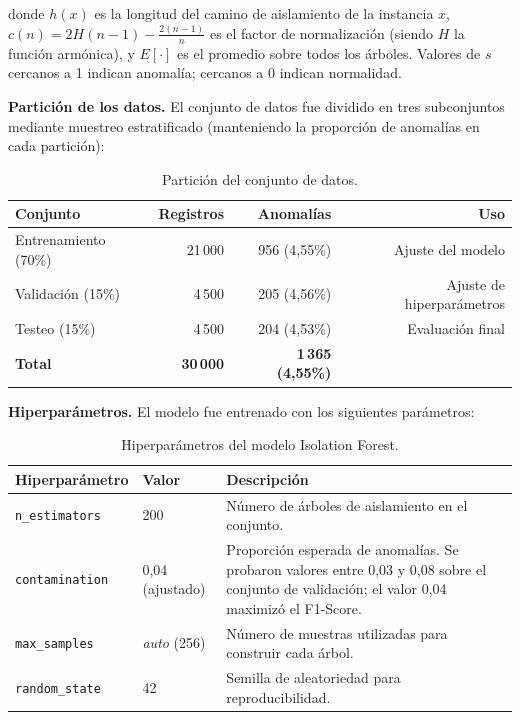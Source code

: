\documentclass[12pt,letterpaper, oneside]{book}
\begin{document}
    donde $h(x)$ es la longitud del camino de aislamiento de la instancia
    $x$, $c(n) = 2H(n-1) - \frac{2(n-1)}{n}$ es el factor de
    normalización (siendo $H$ la función armónica), y $E[\cdot]$ es el
    promedio sobre todos los árboles. Valores de $s$ cercanos a 1
    indican anomalía; cercanos a 0 indican normalidad.

    \textbf{Partición de los datos.} El conjunto de datos fue dividido
    en tres subconjuntos mediante muestreo estratificado (manteniendo
    la proporción de anomalías en cada partición):

    \begin{table}[H]
    \centering
    \begin{tabular}{lrrr}
    \toprule
    \textbf{Conjunto} & \textbf{Registros} & \textbf{Anomalías} &
    \textbf{Uso} \\
    \midrule
    Entrenamiento (70\%) & 21\,000 & 956 (4,55\%) & Ajuste del modelo \\
    Validación (15\%)    &  4\,500 & 205 (4,56\%) & Ajuste de hiperparámetros \\
    Testeo (15\%)        &  4\,500 & 204 (4,53\%) & Evaluación final \\
    \midrule
    \textbf{Total}       & \textbf{30\,000} & \textbf{1\,365 (4,55\%)} & \\
    \bottomrule
    \end{tabular}
    \caption{Partición del conjunto de datos.}
    \label{tab:particion}
    \end{table}

    \textbf{Hiperparámetros.} El modelo fue entrenado con los siguientes
    parámetros:

    \begin{table}[H]
    \centering
    \begin{tabular}{llp{7cm}}
    \toprule
    \textbf{Hiperparámetro} & \textbf{Valor} & \textbf{Descripción} \\
    \midrule
    \texttt{n\_estimators}  & 200 &
        Número de árboles de aislamiento en el conjunto. \\
    \texttt{contamination}  & 0,04 (ajustado) &
        Proporción esperada de anomalías. Se probaron valores entre 0,03 y 0,08
        sobre el conjunto de validación; el valor 0,04 maximizó el F1-Score. \\
    \texttt{max\_samples}   & \textit{auto} (256) &
        Número de muestras utilizadas para construir cada árbol. \\
    \texttt{random\_state}  & 42 &
        Semilla de aleatoriedad para reproducibilidad. \\
    \bottomrule
    \end{tabular}
    \caption{Hiperparámetros del modelo Isolation Forest.}
    \label{tab:hiperparametros}
    \end{table}
\end{document}
